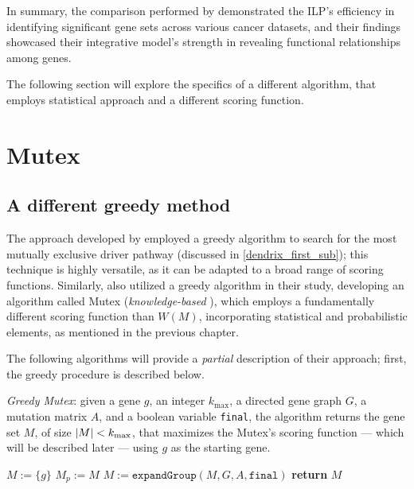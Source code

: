 In summary, the comparison performed by \textcite{mdpfinder} demonstrated the ILP's efficiency in identifying significant gene sets across various cancer datasets, and their findings showcased their integrative model's strength in revealing functional relationships among genes.

The following section will explore the specifics of a different algorithm, that employs statistical approach and a different scoring function.

\section{Mutex}

\subsection{A different greedy method}

The approach developed by \textcite{dendrix} employed a greedy algorithm to search for the most mutually exclusive driver pathway (discussed in \cref{dendrix_first_sub}); this technique is highly versatile, as it can be adapted to a broad range of scoring functions. Similarly, \textcite{mutex} also utilized a greedy algorithm in their study, developing an algorithm called Mutex (\textit{knowledge-based} \cite{survey}), which employs a fundamentally different scoring function than $W(M)$, incorporating statistical and probabilistic elements, as mentioned in the previous chapter.

The following algorithms will provide a \textit{partial} description of their approach; first, the greedy procedure is described below.

\begin{algorithm}[H]
    \caption{
        \textit{Greedy Mutex}: given a gene $g$, an integer $k_\mathrm{max}$, a directed gene graph $G$, a mutation matrix $A$, and a boolean variable \texttt{final}, the algorithm returns the gene set $M$, of size $\left|M\right| < k_\mathrm{max}$, that maximizes the Mutex's scoring function --- which will be described later --- using $g$ as the starting gene.
    }

        \label{greedy_mutex}
    \begin{algorithmic}[1]
            \State $M := \{g\}$
            \Do
                \State $M_p := M$
                \State $M := \texttt{expandGroup}(M, G, A, \texttt{final})$ 
             
            \State \textbf{return} $M$
        \EndFunction
    \end{algorithmic}
\end{algorithm}

